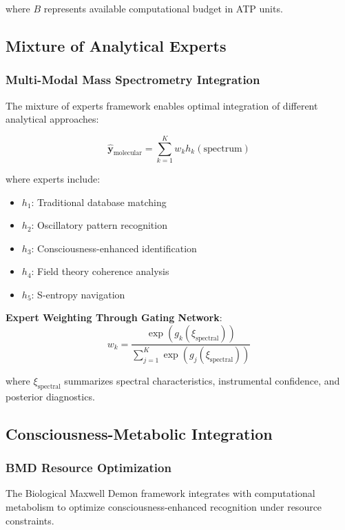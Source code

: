 \documentclass[11pt,a4paper]{article}
\theoremstyle{remark}
\begin{document}
where $B$ represents available computational budget in ATP units.

\subsection{Mixture of Analytical Experts}

\subsubsection{Multi-Modal Mass Spectrometry Integration}

The mixture of experts framework enables optimal integration of different analytical approaches:

\begin{equation}
\hat{\mathbf{y}}_{\text{molecular}} = \sum_{k=1}^{K} w_k h_k(\text{spectrum})
\end{equation}

where experts include:
\begin{itemize}
\item $h_1$: Traditional database matching
\item $h_2$: Oscillatory pattern recognition  
\item $h_3$: Consciousness-enhanced identification
\item $h_4$: Field theory coherence analysis
\item $h_5$: S-entropy navigation
\end{itemize}

\textbf{Expert Weighting Through Gating Network}:
\begin{equation}
w_k = \frac{\exp(g_k(\xi_{\text{spectral}}))}{\sum_{j=1}^{K} \exp(g_j(\xi_{\text{spectral}}))}
\end{equation}

where $\xi_{\text{spectral}}$ summarizes spectral characteristics, instrumental confidence, and posterior diagnostics.

\subsection{Consciousness-Metabolic Integration}

\subsubsection{BMD Resource Optimization}

The Biological Maxwell Demon framework integrates with computational metabolism to optimize consciousness-enhanced recognition under resource constraints.
\end{document}
